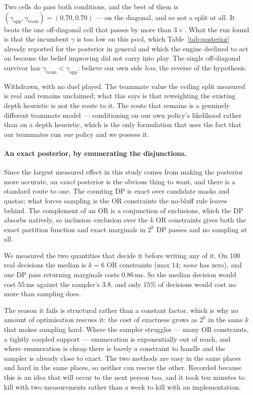 \documentclass[11pt,letterpaper]{article}
\begin{document}
Two cells do pass both conditions, and the best of them is
$(\gamma_{\mathrm{opp}}, \gamma_{\mathrm{team}}) = (0.70, 0.70)$ --- on the
diagonal, and so not a split at all. It beats the one off-diagonal cell that
passes by more than $3\times$. What the run found is that the incumbent $\gamma$
is too low on this pool, which Table~\ref{tab:posterior} already reported for
the posterior in general and which the engine declined to act on because the
belief improving did not carry into play. The single off-diagonal survivor has
$\gamma_{\mathrm{team}} < \gamma_{\mathrm{opp}}$: believe our own side
\emph{less}, the reverse of the hypothesis.

Withdrawn, with no duel played. The teammate value the ceiling split measured
is real and remains unclaimed; what this says is that reweighting the existing
depth heuristic is not the route to it. The route that remains is a genuinely
different teammate model --- conditioning on our own policy's likelihood rather
than on a depth heuristic, which is the only formulation that uses the fact that
our teammates run \emph{our} policy and we possess it.

\paragraph{An exact posterior, by enumerating the disjunctions.} Since the
largest measured effect in this study comes from making the posterior more
accurate, an \emph{exact} posterior is the obvious thing to want, and there is a
standard route to one. The counting DP is exact over candidate masks and quotas;
what forces sampling is the OR constraints the no-bluff rule leaves behind. The
complement of an OR is a conjunction of exclusions, which the DP absorbs
natively, so inclusion--exclusion over the $k$ OR constraints gives both the
exact partition function and exact marginals in $2^k$ DP passes and no sampling
at all.

We measured the two quantities that decide it before writing any of it. On 100
real decisions the median is $k = 6$ OR constraints (max $14$; \emph{none} has
zero), and one DP pass returning marginals costs $0.86$\,ms. So the median
decision would cost $55$\,ms against the sampler's $3.8$, and only $15\%$ of
decisions would cost no more than sampling does.

The reason it fails is structural rather than a constant factor, which is why no
amount of optimisation rescues it: the cost of exactness grows as $2^k$ in the
same $k$ that makes sampling hard. Where the sampler struggles --- many OR
constraints, a tightly coupled support --- enumeration is exponentially out of
reach, and where enumeration is cheap there is barely a constraint to handle and
the sampler is already close to exact. The two methods are easy in the same
places and hard in the same places, so neither can rescue the other. Recorded
because this is an idea that will occur to the next person too, and it took ten
minutes to kill with two measurements rather than a week to kill with an
implementation.
\end{document}
